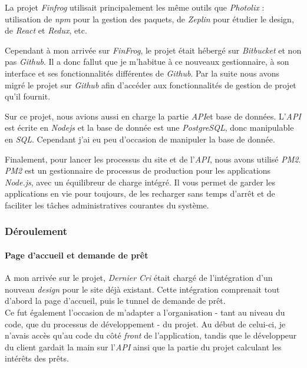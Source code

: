\bigskip

La projet \emph{Finfrog} utilisait principalement les même outils que
\emph{Photolix} : utilisation de \emph{npm} pour la gestion des paquets,
de \emph{Zeplin} pour étudier le design, de \emph{React} et
\emph{Redux}, etc.

\bigskip

Cependant à mon arrivée sur \emph{FinFrog}, le projet était hébergé sur
\emph{Bitbucket} et non pas \emph{Github}. Il a donc fallut que je
m'habitue à ce nouveaux gestionnaire, à son interface et ses
fonctionnalités différentes de \emph{Github}. Par la suite nous avons
migré le projet sur \emph{Github} afin d'accéder aux fonctionnalités de
gestion de projet qu'il fournit.

\bigskip

Sur ce projet, nous avions aussi en charge la partie \emph{API}et base
de données. L'\emph{API} est écrite en \emph{Nodejs} et la base de
donnée est une \emph{PostgreSQL}, donc manipulable en \emph{SQL}.
Cependant j'ai eu peu d'occasion de manipuler la base de donnée.

\bigskip

Finalement, pour lancer les processus du site et de l'\emph{API}, nous
avons utilisé \emph{PM2}. \emph{PM2} est un gestionnaire de processus de
production pour les applications \emph{Node.js}, avec un équilibreur de
charge intégré. Il vous permet de garder les applications en vie pour
toujours, de les recharger sans temps d'arrêt et de faciliter les tâches
administratives courantes du système.

\bigskip

\subsubsection{Déroulement}\label{duxe9roulement-1}

\paragraph{Page d'accueil et demande de
prêt}\label{page-daccueil-et-demande-de-pruxeat}

\bigskip

A mon arrivée sur le projet, \emph{Dernier Cri} était chargé de
l'intégration d'un nouveau \emph{design} pour le site déjà existant.
Cette intégration comprenait tout d'abord la page d'accueil, puis le
tunnel de demande de prêt.\\
Ce fut également l'occasion de m'adapter a l'organisation - tant au
niveau du code, que du processus de développement - du projet. Au début
de celui-ci, je n'avais accès qu'au code du côté \emph{front} de
l'application, tandis que le développeur du client gardait la main sur
l'\emph{API} ainsi que la partie du projet calculant les intérêts des
prêts.

